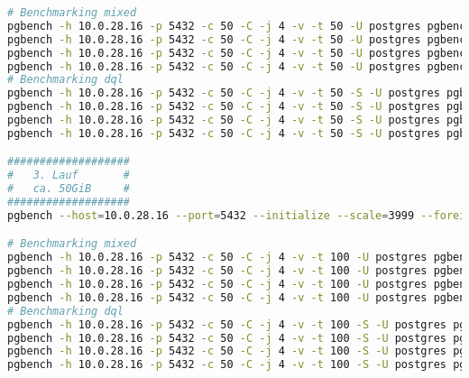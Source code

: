 \begin{flushleft}
\begin{lstlisting}[language=bash, caption=Patroni - Benchmarking-Commands,captionpos=b,label={lst:patroni-benchmarking-commands},breaklines=true]
# Benchmarking mixed
pgbench -h 10.0.28.16 -p 5432 -c 50 -C -j 4 -v -t 50 -U postgres pgbench_eval_bench > /home/itgramic/2_1_patroni_mixed_benchmark.txt
pgbench -h 10.0.28.16 -p 5432 -c 50 -C -j 4 -v -t 50 -U postgres pgbench_eval_bench > /home/itgramic/2_2_patroni_mixed_benchmark.txt
pgbench -h 10.0.28.16 -p 5432 -c 50 -C -j 4 -v -t 50 -U postgres pgbench_eval_bench > /home/itgramic/2_3_patroni_mixed_benchmark.txt
pgbench -h 10.0.28.16 -p 5432 -c 50 -C -j 4 -v -t 50 -U postgres pgbench_eval_bench > /home/itgramic/2_4_patroni_mixed_benchmark.txt
# Benchmarking dql
pgbench -h 10.0.28.16 -p 5432 -c 50 -C -j 4 -v -t 50 -S -U postgres pgbench_eval_bench > /home/itgramic/2_1_patroni_dql_benchmark.txt
pgbench -h 10.0.28.16 -p 5432 -c 50 -C -j 4 -v -t 50 -S -U postgres pgbench_eval_bench > /home/itgramic/2_2_patroni_dql_benchmark.txt
pgbench -h 10.0.28.16 -p 5432 -c 50 -C -j 4 -v -t 50 -S -U postgres pgbench_eval_bench > /home/itgramic/2_3_patroni_dql_benchmark.txt
pgbench -h 10.0.28.16 -p 5432 -c 50 -C -j 4 -v -t 50 -S -U postgres pgbench_eval_bench > /home/itgramic/2_4_patroni_dql_benchmark.txt

###################
#   3. Lauf       #
#   ca. 50GiB     #
###################
pgbench --host=10.0.28.16 --port=5432 --initialize --scale=3999 --foreign-keys --fillfactor=100 --username=dtgvpf --index-tablespace=eval_index_tablespace --tablespace=eval_data_tablespace --username=postgres pgbench_eval_bench

# Benchmarking mixed
pgbench -h 10.0.28.16 -p 5432 -c 50 -C -j 4 -v -t 100 -U postgres pgbench_eval_bench > /home/itgramic/3_1_patroni_mixed_benchmark.txt
pgbench -h 10.0.28.16 -p 5432 -c 50 -C -j 4 -v -t 100 -U postgres pgbench_eval_bench > /home/itgramic/3_2_patroni_mixed_benchmark.txt
pgbench -h 10.0.28.16 -p 5432 -c 50 -C -j 4 -v -t 100 -U postgres pgbench_eval_bench > /home/itgramic/3_3_patroni_mixed_benchmark.txt
pgbench -h 10.0.28.16 -p 5432 -c 50 -C -j 4 -v -t 100 -U postgres pgbench_eval_bench > /home/itgramic/3_4_patroni_mixed_benchmark.txt
# Benchmarking dql
pgbench -h 10.0.28.16 -p 5432 -c 50 -C -j 4 -v -t 100 -S -U postgres pgbench_eval_bench > /home/itgramic/3_1_patroni_dql_benchmark.txt
pgbench -h 10.0.28.16 -p 5432 -c 50 -C -j 4 -v -t 100 -S -U postgres pgbench_eval_bench > /home/itgramic/3_2_patroni_dql_benchmark.txt
pgbench -h 10.0.28.16 -p 5432 -c 50 -C -j 4 -v -t 100 -S -U postgres pgbench_eval_bench > /home/itgramic/3_3_patroni_dql_benchmark.txt
pgbench -h 10.0.28.16 -p 5432 -c 50 -C -j 4 -v -t 100 -S -U postgres pgbench_eval_bench > /home/itgramic/3_4_patroni_dql_benchmark.txt



\end{lstlisting}
\end{flushleft}
